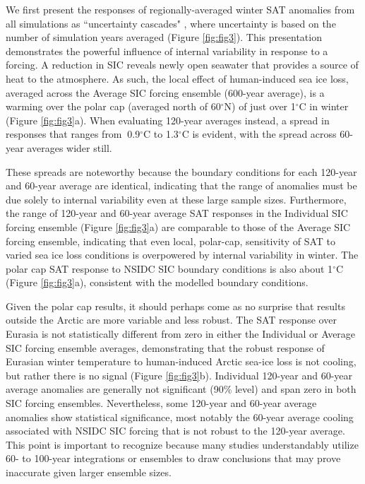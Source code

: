 \documentclass{nature}
\begin{document}
We first present the responses of regionally-averaged winter SAT anomalies from all simulations as ``uncertainty cascades" \cite{wilby10,swart15}, where uncertainty is based on the number of simulation years averaged (Figure \ref{fig:fig3}). This presentation demonstrates the powerful influence of internal variability in response to a forcing. A reduction in SIC reveals newly open seawater that provides a source of heat to the atmosphere. As such, the local effect of human-induced sea ice loss, averaged across the Average SIC forcing ensemble (600-year average), is a warming over the polar cap (averaged north of 60$^\circ$N) of just over 1$^\circ$C in winter (Figure \ref{fig:fig3}a). When evaluating 120-year averages instead, a spread in responses that ranges from $~$0.9$^\circ$C to 1.3$^\circ$C is evident, with the spread across 60-year averages wider still. 

These spreads are noteworthy because the boundary conditions for each 120-year and 60-year average are identical, indicating that the range of anomalies must be due solely to internal variability even at these large sample sizes. Furthermore, the range of 120-year and 60-year average SAT responses in the Individual SIC forcing ensemble (Figure \ref{fig:fig3}a) are comparable to those of the Average SIC forcing ensemble, indicating that even local, polar-cap, sensitivity of SAT to varied sea ice loss conditions is overpowered by internal variability in winter. The polar cap SAT response to NSIDC SIC boundary conditions is also about 1$^\circ$C (Figure \ref{fig:fig3}a), consistent with the modelled boundary conditions.   

Given the polar cap results, it should perhaps come as no surprise that results outside the Arctic are more variable and less robust. The SAT response over Eurasia is not statistically different from zero in either the Individual or Average SIC forcing ensemble averages, demonstrating that the robust response of Eurasian winter temperature to human-induced Arctic sea-ice loss is not cooling, but rather there is no signal (Figure \ref{fig:fig3}b). Individual 120-year and 60-year average anomalies are generally not significant (90\% level) and span zero in both SIC forcing ensembles. Nevertheless, some 120-year and 60-year average anomalies show statistical significance, most notably the 60-year average cooling associated with NSIDC SIC forcing that is not robust to the 120-year average. This point is important to recognize because many studies understandably utilize 60- to 100-year integrations or ensembles to draw conclusions that may prove inaccurate given larger ensemble sizes.
\end{document}
